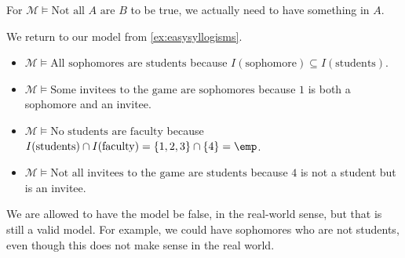 \documentclass[../notes.tex]{subfiles}
\begin{document}
\begin{remark}
	For $\mathcal M\models\textrm{Not all }A\textrm{ are }B$ to be true, we actually need to have something in $A$.
\end{remark}
\begin{example}
	We return to our model from \autoref{ex:easysyllogisms}.
	\begin{itemize}
		\item $\mathcal M\models\textrm{All sophomores are students}$ because $I(\mathrm{sophomore})\subseteq I(\mathrm{students})$.
		\item $\mathcal M\models\textrm{Some invitees to the game are sophomores}$ because $1$ is both a sophomore and an invitee.
		\item $\mathcal M\models\textrm{No students are faculty}$ because $I(\mathrm{students})\cap I(\mathrm{faculty})=\{1,2,3\}\cap\{4\}=\emp$.
		\item $\mathcal M\models\textrm{Not all invitees to the game are students}$ because $4$ is not a student but is an invitee.
	\end{itemize}
\end{example}
\begin{remark}
	We are allowed to have the model be false, in the real-world sense, but that is still a valid model. For example, we could have sophomores who are not students, even though this does not make sense in the real world.
\end{remark}
\end{document}

